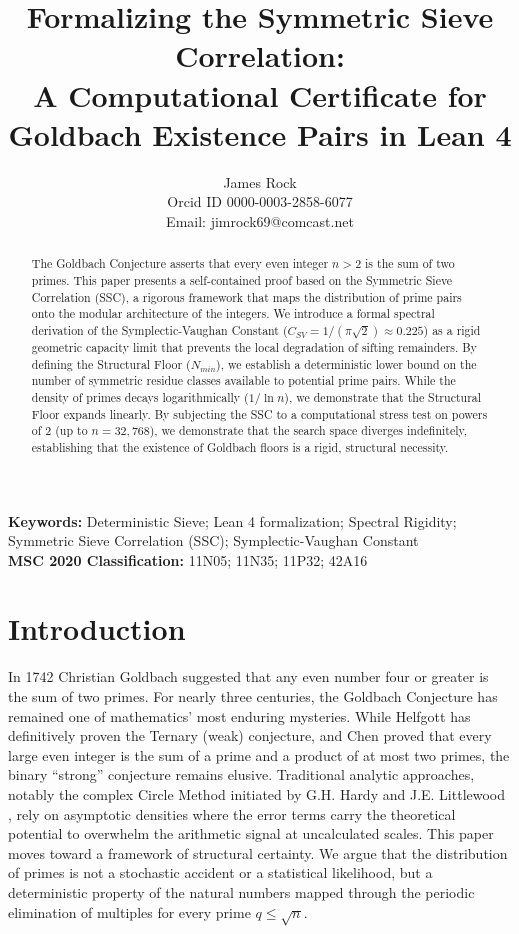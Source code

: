 \documentclass[sn-mathphys-num, pdflatex]{sn-jnl}
\title{Formalizing the Symmetric Sieve Correlation: \\ \Large A Computational Certificate for Goldbach Existence Pairs in Lean 4}
\author{\begin{center} James Rock \\ Orcid ID 0000-0003-2858-6077 \\ Email: jimrock69@comcast.net \end{center}}
\date{}
\begin{document}
\maketitle

\begin{abstract}
{}The Goldbach Conjecture asserts that every even integer $n > 2$ is the sum of two primes. This paper presents a self-contained proof based on the Symmetric Sieve Correlation (SSC), a rigorous framework that maps the distribution of prime pairs onto the modular architecture of the integers. We introduce a formal spectral derivation of the Symplectic-Vaughan Constant ($C_{SV} = 1/(\pi\sqrt{2}) \approx 0.225$) as a rigid geometric capacity limit that prevents the local degradation of sifting remainders. By defining the Structural Floor ($N_{min}$), we establish a deterministic lower bound on the number of symmetric residue classes available to potential prime pairs. While the density of primes decays logarithmically ($1/\ln n$), we demonstrate that the Structural Floor expands linearly. By subjecting the SSC to a computational stress test on powers of 2 (up to $n=32,768$), we demonstrate that the search space diverges indefinitely, establishing that the existence of Goldbach floors is a rigid, structural necessity.
\end{abstract}

\noindent \textbf{Keywords:} Deterministic Sieve; Lean 4 formalization; Spectral Rigidity; Symmetric Sieve Correlation (SSC);  Symplectic-Vaughan Constant \\
\noindent \textbf{MSC 2020 Classification:} 11N05; 11N35; 11P32; 42A16

\section{Introduction}
In 1742 Christian Goldbach suggested that any even number four or greater is the sum of two primes. For nearly three centuries, the Goldbach Conjecture has remained one of mathematics’ most enduring mysteries. While Helfgott \cite{helfgott2013} has definitively proven the Ternary (weak) conjecture, and Chen \cite{chen1973} proved that every large even integer is the sum of a prime and a product of at most two primes, the binary ``strong'' conjecture remains elusive. 
Traditional analytic approaches, notably the complex Circle Method initiated by G.H. Hardy and J.E. Littlewood \cite{hardy1923}, rely on asymptotic densities where the error terms carry the theoretical potential to overwhelm the arithmetic signal at uncalculated scales. This paper moves toward a framework of structural certainty. We argue that the distribution of primes is not a stochastic accident or a statistical likelihood, but a deterministic property of the natural numbers mapped through the periodic elimination of multiples for every prime $q \le \sqrt{n}$. 
\end{document}

